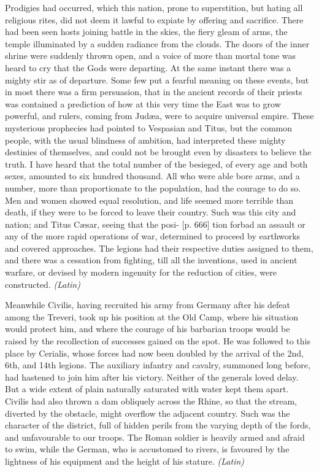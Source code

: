 Prodigies had occurred, which this nation, prone to superstition, but hating all religious rites, did not deem it lawful to expiate by offering and sacrifice. There had been seen hosts joining battle in the skies, the fiery gleam of arms, the temple illuminated by a sudden radiance from the clouds. The doors of the inner shrine were suddenly thrown open, and a voice of more than mortal tone was heard to cry that the Gods were departing. At the same instant there was a mighty stir as of departure. Some few put a fearful meaning on these events, but in most there was a firm persuasion, that in the ancient records of their priests was contained a prediction of how at this very time the East was to grow powerful, and rulers, coming from Judæa, were to acquire universal empire. These mysterious prophecies had pointed to Vespasian and Titus, but the common people, with the usual blindness of ambition, had interpreted these mighty destinies of themselves, and could not be brought even by disasters to believe the truth. I have heard that the total number of the besieged, of every age and both sexes, amounted to six hundred thousand. All who were able bore arms, and a number, more than proportionate to the population, had the courage to do so. Men and women showed equal resolution, and life seemed more terrible than death, if they were to be forced to leave their country. Such was this city and nation; and Titus Cæsar, seeing that the posi- [p. 666] tion forbad an assault or any of the more rapid operations of war, determined to proceed by earthworks and covered approaches. The legions had their respective duties assigned to them, and there was a cessation from fighting, till all the inventions, used in ancient warfare, or devised by modern ingenuity for the reduction of cities, were constructed. \emph{(Latin)}


Meanwhile Civilis, having recruited his army from Germany after his defeat among the Treveri, took up his position at the Old Camp, where his situation would protect him, and where the courage of his barbarian troops would be raised by the recollection of successes gained on the spot. He was followed to this place by Cerialis, whose forces had now been doubled by the arrival of the 2nd, 6th, and 14th legions. The auxiliary infantry and cavalry, summoned long before, had hastened to join him after his victory. Neither of the generals loved delay. But a wide extent of plain naturally saturated with water kept them apart. Civilis had also thrown a dam obliquely across the Rhine, so that the stream, diverted by the obstacle, might overflow the adjacent country. Such was the character of the district, full of hidden perils from the varying depth of the fords, and unfavourable to our troops. The Roman soldier is heavily armed and afraid to swim, while the German, who is accustomed to rivers, is favoured by the lightness of his equipment and the height of his stature. \emph{(Latin)}

